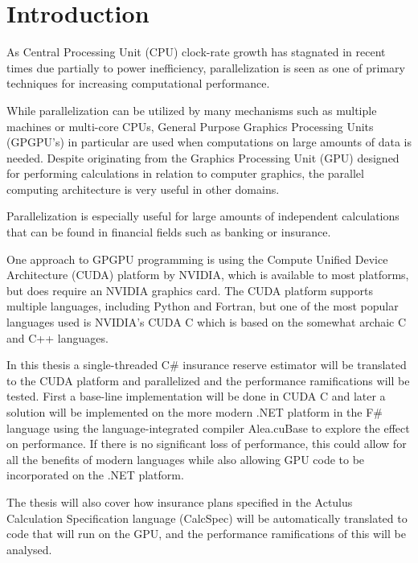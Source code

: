 \section{Introduction}
As Central Processing Unit (CPU) clock-rate growth has stagnated in recent times due partially to power inefficiency\cite{ross2008cpu}, parallelization is seen as one of primary techniques for increasing computational performance.

While parallelization can be utilized by many mechanisms such as multiple machines or multi-core CPUs, General Purpose Graphics Processing Units (GPGPU's) in particular are used when computations on large amounts of data is needed. 
Despite originating from the Graphics Processing Unit (GPU) designed for performing calculations in relation to computer graphics, the parallel computing architecture is very useful in other domains.

Parallelization is especially useful for large amounts of independent calculations that can be found in financial fields such as banking or insurance.

One approach to GPGPU programming is using the Compute Unified Device Architecture (CUDA) platform by NVIDIA, which is available to most platforms, but does require an NVIDIA graphics card.
The CUDA platform supports multiple languages, including Python and Fortran, but one of the most popular languages used is NVIDIA's CUDA C which is based on the somewhat archaic C and C++ languages.

In this thesis a single-threaded C\# insurance reserve estimator will be translated to the CUDA platform and parallelized and the performance ramifications will be tested.
First a base-line implementation will be done in CUDA C and later a solution will be implemented on the more modern .NET platform in the F\# language using the language-integrated compiler Alea.cuBase to explore the effect on performance.
If there is no significant loss of performance, this could allow for all the benefits of modern languages while also allowing GPU code to be incorporated on the .NET platform.


The thesis will also cover how insurance plans specified in the Actulus Calculation Specification language (CalcSpec) will be automatically translated to code that will run on the GPU, and the performance ramifications of this will be analysed.

